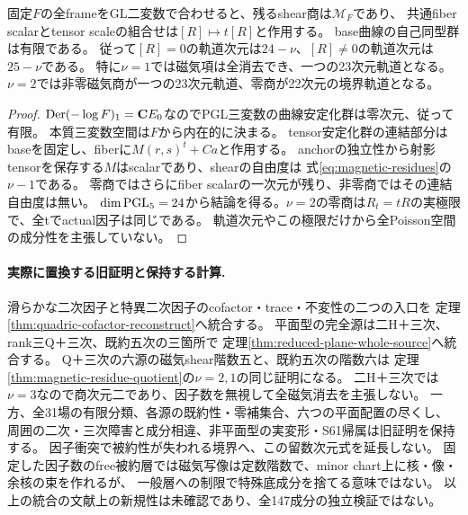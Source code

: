 \begin{proposition}[磁気零境界と軌道次元]\label{prop:plane-magnetic-orbits}
固定$F$の全frameをGL二変数で合わせると、残るshear商は$\mathcal M_F$であり、
共通fiber scalarとtensor scaleの組合せは$[R]\mapsto t[R]$と作用する。
base曲線の自己同型群は有限である。
従って$[R]=0$の軌道次元は$24-\nu$、$[R]\ne0$の軌道次元は$25-\nu$である。
特に$\nu=1$では磁気項は全消去でき、一つの23次元軌道となる。
$\nu=2$では非零磁気商が一つの23次元軌道、零商が22次元の境界軌道となる。
\end{proposition}
\begin{proof}
$\operatorname{Der}(-\log F)_1=\mathbf C E_0$なのでPGL三変数の曲線安定化群は零次元、従って有限。
本質三変数空間は$F$から内在的に決まる。
tensor安定化群の連結部分はbaseを固定し、fiberに$M(r,s)^t+Ca$と作用する。
anchorの独立性から射影tensorを保存する$M$はscalarであり、shearの自由度は
式\eqref{eq:magnetic-residues}の$\nu-1$である。
零商ではさらにfiber scalarの一次元が残り、非零商ではその連結自由度は無い。
$\dim\operatorname{PGL}_5=24$から結論を得る。$\nu=2$の零商は$R_t=tR$の実極限で、全tでactual因子は同じである。
軌道次元やこの極限だけから全Poisson空間の成分性を主張していない。
\end{proof}

\paragraph{実際に置換する旧証明と保持する計算.}
滑らかな二次因子と特異二次因子のcofactor・trace・不変性の二つの入口を
定理\ref{thm:quadric-cofactor-reconstruct}へ統合する。
平面型の完全源は二H＋三次、rank三Q＋三次、既約五次の三箇所で
定理\ref{thm:reduced-plane-whole-source}へ統合する。
Q＋三次の六源の磁気shear階数五と、既約五次の階数六は
定理\ref{thm:magnetic-residue-quotient}の$\nu=2,1$の同じ証明になる。
二H＋三次では$\nu=3$なので商次元二であり、因子数を無視して全磁気消去を主張しない。
一方、全31場の有限分類、各源の既約性・零補集合、六つの平面配置の尽くし、
周囲の二次・三次障害と成分相違、非平面型の実変形・S61帰属は旧証明を保持する。
因子衝突で被約性が失われる境界へ、この留数次元式を延長しない。
固定した因子数のfree被約層では磁気写像は定数階数で、minor chart上に核・像・余核の束を作れるが、
一般層への制限で特殊底成分を捨てる意味ではない。
以上の統合の文献上の新規性は未確認であり、全147成分の独立検証ではない。
